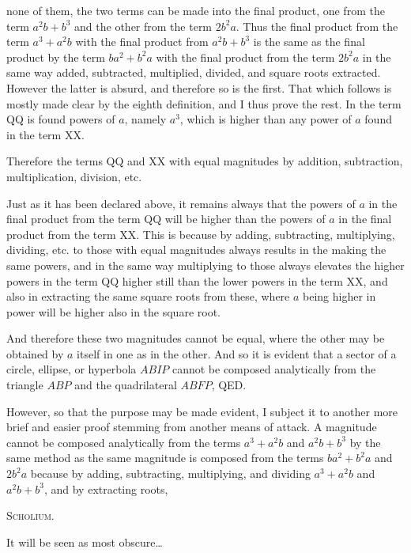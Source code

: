\documentclass[11pt,letterpaper]{book}
\begin{document}
none of them, the two terms can be made into the final product, one from the term
$a^{2}b+b^{3}$ and the other from the term $2b^{2}a$. 
Thus the final product from the term $a^{3}+a^{2}b$ with the final product from
$a^{2}b+b^{3}$ is the same as the final product by the term $ba^{2}+b^{2}a$ with
the final product from the term $2b^{2}a$ in the same way added, subtracted,
multiplied, divided, and square roots extracted.
However the latter is absurd, and therefore so is the first.
That which follows is mostly made clear by the eighth definition, and I thus
prove the rest.
In the term QQ is found powers of $a$, namely $a^3$, which is higher than any
power of $a$ found in the term XX.

Therefore the terms QQ and XX with equal magnitudes by
addition, subtraction, multiplication, division, etc.

Just as it has been declared above, it remains always that the powers of $a$ in
the final product from the term QQ will be higher than the powers of $a$ in the
final product from the term XX.
This is because by adding, subtracting, multiplying,
dividing, etc. to those with equal magnitudes always results in the making the
same powers, and in the same way multiplying to those always elevates the higher
powers in the term QQ higher still than the lower powers in the term XX,
and also in extracting the same square roots from these, where $a$ being higher
in power will be higher also in the square root.



\noindent And therefore these two magnitudes cannot be equal, where the other may be
obtained by $a$ itself in one as in the other. And so it is evident that a
sector of a circle, ellipse, or hyperbola $ABIP$ cannot be composed analytically
from the triangle $ABP$ and the quadrilateral $ABFP$, QED.

However, so that the purpose may be made evident, I subject it to another more
brief and easier proof stemming from another means of attack. A magnitude cannot
be composed analytically from the terms $a^{3}+a^{2}b$ and $a^{2}b+b^{3}$ by the
same method as the same magnitude is composed from the terms $ba^{2}+b^{2}a$ and
$2b^{2}a$ because by adding, subtracting, multiplying, and dividing
$a^{3}+a^{2}b$ and $a^{2}b+b^{3}$, and by extracting roots, 


\begin{samepage}
\begin{center}
\large\textsc{Scholium.}
\end{center}

It will be seen as most obscure\ldots
\end{samepage}
\end{document}
